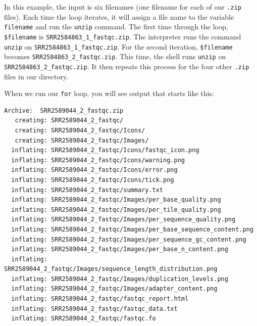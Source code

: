 \documentclass[
  letterpaper,
  DIV=11,
  numbers=noendperiod]{scrreprt}
\newenvironment{Shaded}{\begin{snugshade}}{\end{snugshade}}
\newcommand{\ExtensionTok}[1]{\textcolor[rgb]{0.00,0.23,0.31}{#1}}
\newcommand{\NormalTok}[1]{\textcolor[rgb]{0.00,0.23,0.31}{#1}}
\newcommand{\OperatorTok}[1]{\textcolor[rgb]{0.37,0.37,0.37}{#1}}
\newcommand{\PreprocessorTok}[1]{\textcolor[rgb]{0.68,0.00,0.00}{#1}}
\newcommand{\VariableTok}[1]{\textcolor[rgb]{0.07,0.07,0.07}{#1}}
\begin{document}
\begin{Shaded}
\end{Shaded}

In this example, the input is six filenames (one filename for each of
our \texttt{.zip} files). Each time the loop iterates, it will assign a
file name to the variable \texttt{filename} and run the \texttt{unzip}
command. The first time through the loop, \texttt{\$filename} is
\texttt{SRR2584863\_1\_fastqc.zip}. The interpreter runs the command
\texttt{unzip} on \texttt{SRR2584863\_1\_fastqc.zip}. For the second
iteration, \texttt{\$filename} becomes
\texttt{SRR2584863\_2\_fastqc.zip}. This time, the shell runs
\texttt{unzip} on \texttt{SRR2584863\_2\_fastqc.zip}. It then repeats
this process for the four other \texttt{.zip} files in our directory.

When we run our \texttt{for} loop, you will see output that starts like
this:

\begin{verbatim}
Archive:  SRR2589044_2_fastqc.zip
   creating: SRR2589044_2_fastqc/
   creating: SRR2589044_2_fastqc/Icons/
   creating: SRR2589044_2_fastqc/Images/
  inflating: SRR2589044_2_fastqc/Icons/fastqc_icon.png
  inflating: SRR2589044_2_fastqc/Icons/warning.png
  inflating: SRR2589044_2_fastqc/Icons/error.png
  inflating: SRR2589044_2_fastqc/Icons/tick.png
  inflating: SRR2589044_2_fastqc/summary.txt
  inflating: SRR2589044_2_fastqc/Images/per_base_quality.png
  inflating: SRR2589044_2_fastqc/Images/per_tile_quality.png
  inflating: SRR2589044_2_fastqc/Images/per_sequence_quality.png
  inflating: SRR2589044_2_fastqc/Images/per_base_sequence_content.png
  inflating: SRR2589044_2_fastqc/Images/per_sequence_gc_content.png
  inflating: SRR2589044_2_fastqc/Images/per_base_n_content.png
  inflating: SRR2589044_2_fastqc/Images/sequence_length_distribution.png
  inflating: SRR2589044_2_fastqc/Images/duplication_levels.png
  inflating: SRR2589044_2_fastqc/Images/adapter_content.png
  inflating: SRR2589044_2_fastqc/fastqc_report.html
  inflating: SRR2589044_2_fastqc/fastqc_data.txt
  inflating: SRR2589044_2_fastqc/fastqc.fo
\end{verbatim}
\end{document}
